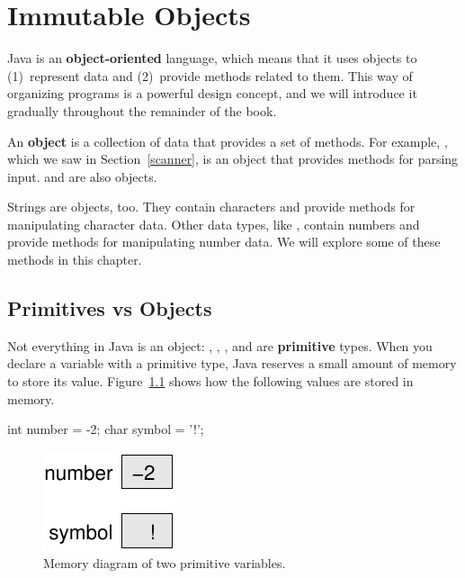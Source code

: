 \chapter{Immutable Objects}
\label{immutable}


Java is an {\bf object-oriented} language, which means that it uses objects to (1)~represent data and (2)~provide methods related to them.
This way of organizing programs is a powerful design concept, and we will introduce it gradually throughout the remainder of the book.


An {\bf object} is a collection of data that provides a set of methods.
For example, , which we saw in Section~\ref{scanner}, is an object that provides methods for parsing input.
 and  are also objects.

Strings are objects, too.
They contain characters and provide methods for manipulating character data.
Other data types, like , contain numbers and provide methods for manipulating number data.
We will explore some of these methods in this chapter.


\section{Primitives vs Objects}


Not everything in Java is an object: , , , and  are {\bf primitive} types.
When you declare a variable with a primitive type, Java reserves a small amount of memory to store its value.
Figure~\ref{fig.mem1} shows how the following values are stored in memory.

\begin{code}
int number = -2;
char symbol = '!';
\end{code}

\begin{figure}[!ht]
\begin{center}
\includegraphics{figs/mem1.pdf}
\caption{Memory diagram of two primitive variables.}
\label{fig.mem1}
\end{center}
\end{figure}

